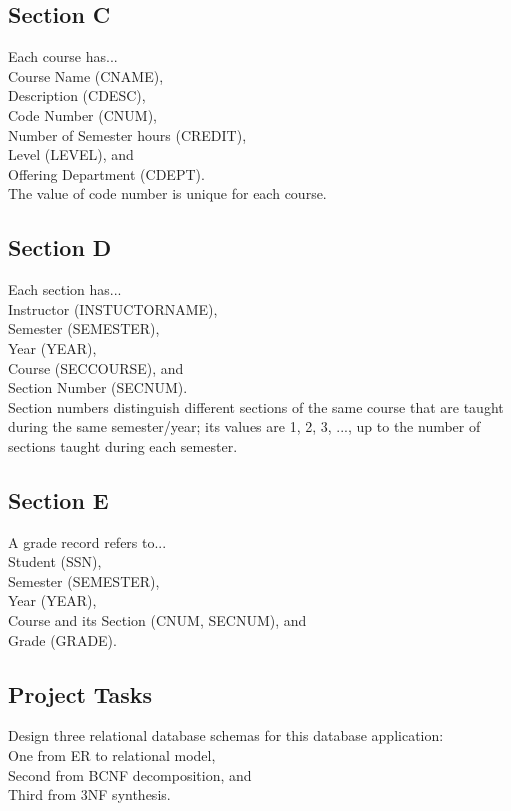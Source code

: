 \documentclass[12pt]{article}
\newcommand\tab[1][1cm]{\hspace*{#1}}
\begin{document}
		\subsection{Section C}
			Each course has...\\
				\tab Course Name (CNAME),\\
				\tab Description (CDESC),\\
				\tab Code Number (CNUM),\\
				\tab Number of Semester hours (CREDIT),\\
				\tab Level (LEVEL), and\\
				\tab Offering Department (CDEPT).\\
			The value of code number is unique for each course.

		\subsection{Section D}
			Each section has...\\
				\tab Instructor (INSTUCTORNAME),\\
				\tab Semester (SEMESTER),\\
				\tab Year (YEAR),\\
				\tab Course (SECCOURSE), and\\
				\tab Section Number (SECNUM).\\
			Section numbers distinguish different sections of the same course that are taught during the same semester/year; its values are 1, 2, 3, ..., up to the number of sections taught during each semester.

		\subsection{Section E}
			A grade record refers to...\\
				\tab Student (SSN),\\
				\tab Semester (SEMESTER),\\
				\tab Year (YEAR),\\
				\tab Course and its Section (CNUM, SECNUM), and\\
				\tab Grade (GRADE).
	
		\subsection{Project Tasks}
			Design three relational database schemas for this database application:\\
				\tab One from ER to relational model,\\
				\tab Second from BCNF decomposition, and\\
				\tab Third from 3NF synthesis.
\end{document}
